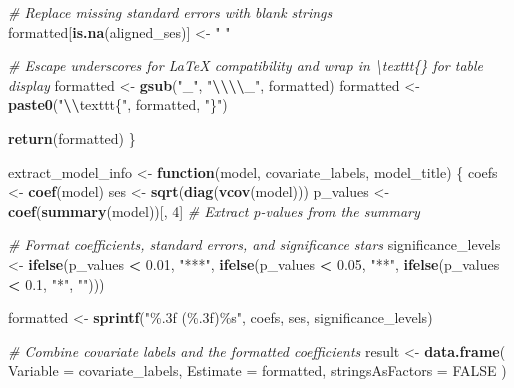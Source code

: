 \documentclass[
]{article}
\newenvironment{Shaded}{\begin{snugshade}}{\end{snugshade}}
\newcommand{\AttributeTok}[1]{\textcolor[rgb]{0.13,0.29,0.53}{#1}}
\newcommand{\CommentTok}[1]{\textcolor[rgb]{0.56,0.35,0.01}{\textit{#1}}}
\newcommand{\ConstantTok}[1]{\textcolor[rgb]{0.56,0.35,0.01}{#1}}
\newcommand{\ControlFlowTok}[1]{\textcolor[rgb]{0.13,0.29,0.53}{\textbf{#1}}}
\newcommand{\DecValTok}[1]{\textcolor[rgb]{0.00,0.00,0.81}{#1}}
\newcommand{\FloatTok}[1]{\textcolor[rgb]{0.00,0.00,0.81}{#1}}
\newcommand{\FunctionTok}[1]{\textcolor[rgb]{0.13,0.29,0.53}{\textbf{#1}}}
\newcommand{\NormalTok}[1]{#1}
\newcommand{\OtherTok}[1]{\textcolor[rgb]{0.56,0.35,0.01}{#1}}
\newcommand{\SpecialCharTok}[1]{\textcolor[rgb]{0.81,0.36,0.00}{\textbf{#1}}}
\newcommand{\StringTok}[1]{\textcolor[rgb]{0.31,0.60,0.02}{#1}}
\begin{document}
\begin{Shaded}
\begin{Highlighting}[]
  \CommentTok{\# Replace missing standard errors with blank strings}
\NormalTok{  formatted[}\FunctionTok{is.na}\NormalTok{(aligned\_ses)] }\OtherTok{\textless{}{-}} \StringTok{" "}

  \CommentTok{\# Escape underscores for LaTeX compatibility and wrap in \textbackslash{}texttt\{\} for table display}
\NormalTok{  formatted }\OtherTok{\textless{}{-}} \FunctionTok{gsub}\NormalTok{(}\StringTok{"\_"}\NormalTok{, }\StringTok{"}\SpecialCharTok{\textbackslash{}\textbackslash{}\textbackslash{}\textbackslash{}}\StringTok{\_"}\NormalTok{, formatted)}
\NormalTok{  formatted }\OtherTok{\textless{}{-}} \FunctionTok{paste0}\NormalTok{(}\StringTok{"}\SpecialCharTok{\textbackslash{}\textbackslash{}}\StringTok{texttt\{"}\NormalTok{, formatted, }\StringTok{"\}"}\NormalTok{)}

  \FunctionTok{return}\NormalTok{(formatted)}
\NormalTok{\}}

\NormalTok{extract\_model\_info }\OtherTok{\textless{}{-}} \ControlFlowTok{function}\NormalTok{(model, covariate\_labels, model\_title) \{}
\NormalTok{  coefs }\OtherTok{\textless{}{-}} \FunctionTok{coef}\NormalTok{(model)}
\NormalTok{  ses }\OtherTok{\textless{}{-}} \FunctionTok{sqrt}\NormalTok{(}\FunctionTok{diag}\NormalTok{(}\FunctionTok{vcov}\NormalTok{(model)))}
\NormalTok{  p\_values }\OtherTok{\textless{}{-}} \FunctionTok{coef}\NormalTok{(}\FunctionTok{summary}\NormalTok{(model))[, }\DecValTok{4}\NormalTok{]  }\CommentTok{\# Extract p{-}values from the summary}
  
  \CommentTok{\# Format coefficients, standard errors, and significance stars}
\NormalTok{  significance\_levels }\OtherTok{\textless{}{-}} \FunctionTok{ifelse}\NormalTok{(p\_values }\SpecialCharTok{\textless{}} \FloatTok{0.01}\NormalTok{, }\StringTok{"***"}\NormalTok{,}
                                \FunctionTok{ifelse}\NormalTok{(p\_values }\SpecialCharTok{\textless{}} \FloatTok{0.05}\NormalTok{, }\StringTok{"**"}\NormalTok{,}
                                       \FunctionTok{ifelse}\NormalTok{(p\_values }\SpecialCharTok{\textless{}} \FloatTok{0.1}\NormalTok{, }\StringTok{"*"}\NormalTok{, }\StringTok{""}\NormalTok{)))}
  
\NormalTok{  formatted }\OtherTok{\textless{}{-}} \FunctionTok{sprintf}\NormalTok{(}\StringTok{"\%.3f (\%.3f)\%s"}\NormalTok{, coefs, ses, significance\_levels)}
  
  \CommentTok{\# Combine covariate labels and the formatted coefficients}
\NormalTok{  result }\OtherTok{\textless{}{-}} \FunctionTok{data.frame}\NormalTok{(}
    \AttributeTok{Variable =}\NormalTok{ covariate\_labels,}
    \AttributeTok{Estimate =}\NormalTok{ formatted,}
    \AttributeTok{stringsAsFactors =} \ConstantTok{FALSE}
\NormalTok{  )}
  

\end{Highlighting}
\end{Shaded}
\end{document}
